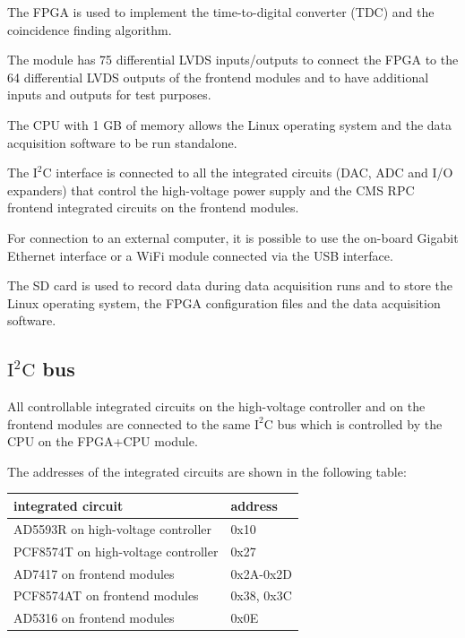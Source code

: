 \documentclass[12pt, a4paper]{article}
\begin{document}
The FPGA is used to implement the time-to-digital converter (TDC) and the coincidence finding algorithm.

The module has 75 differential LVDS inputs/outputs to connect the FPGA to the 64 differential LVDS outputs of the frontend modules and to have additional inputs and outputs for test purposes.

The CPU with 1 GB of memory allows the Linux operating system and the data acquisition software to be run standalone.

The $\text{I}^\text{2}\text{C}$ interface is connected to all the integrated circuits (DAC, ADC and I/O expanders) that control the high-voltage power supply and the CMS RPC frontend integrated circuits on the frontend modules.

For connection to an external computer, it is possible to use the on-board Gigabit Ethernet interface or a WiFi module connected via the USB interface.

The SD card is used to record data during data acquisition runs and to store the Linux operating system, the FPGA configuration files and the data acquisition software.

\subsection{$\text{I}^\text{2}\text{C}$ bus}

All controllable integrated circuits on the high-voltage controller and on the frontend modules are connected to the same $\text{I}^\text{2}\text{C}$ bus which is controlled by the CPU on the FPGA+CPU module.

The addresses of the integrated circuits are shown in the following table:
\begin{center}
  \begin{tabular}{|l|l|}
  \hline
  \textbf{integrated circuit} & \textbf{address} \\
  \hline
  AD5593R on high-voltage controller & 0x10 \\
  \hline
  PCF8574T on high-voltage controller & 0x27 \\
  \hline
  AD7417 on frontend modules & 0x2A-0x2D \\
  \hline
  PCF8574AT on frontend modules & 0x38, 0x3C \\
  \hline
  AD5316 on frontend modules & 0x0E \\
  \hline
  \end{tabular}
\end{center}
\end{document}
